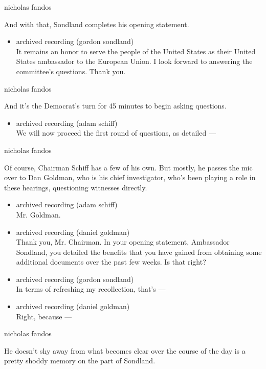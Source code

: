 nicholas fandos

And with that, Sondland completes his opening statement.

\begin{itemize}
\tightlist
\item
  archived recording (gordon sondland)\\
  It remains an honor to serve the people of the United States as their
  United States ambassador to the European Union. I look forward to
  answering the committee's questions. Thank you.
\end{itemize}

nicholas fandos

And it's the Democrat's turn for 45 minutes to begin asking questions.

\begin{itemize}
\tightlist
\item
  archived recording (adam schiff)\\
  We will now proceed the first round of questions, as detailed ---
\end{itemize}

nicholas fandos

Of course, Chairman Schiff has a few of his own. But mostly, he passes
the mic over to Dan Goldman, who is his chief investigator, who's been
playing a role in these hearings, questioning witnesses directly.

\begin{itemize}
\item
  archived recording (adam schiff)\\
  Mr. Goldman.
\item
  archived recording (daniel goldman)\\
  Thank you, Mr. Chairman. In your opening statement, Ambassador
  Sondland, you detailed the benefits that you have gained from
  obtaining some additional documents over the past few weeks. Is that
  right?
\item
  archived recording (gordon sondland)\\
  In terms of refreshing my recollection, that's ---
\item
  archived recording (daniel goldman)\\
  Right, because ---
\end{itemize}

nicholas fandos

He doesn't shy away from what becomes clear over the course of the day
is a pretty shoddy memory on the part of Sondland.

